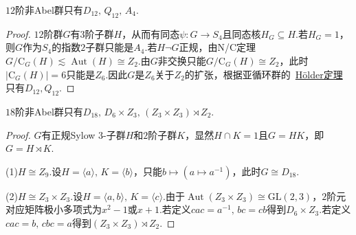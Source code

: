 \begin{prop}
	$12$阶非Abel群只有$D_{12},\,Q_{12},\,A_4$.
\end{prop}
\begin{proof}
	$12$阶群$G$有$3$阶子群$H$，从而有同态$\psi\colon G\to S_4$且同态核$H_G\subseteq H$.若$H_G=1$，则$G$作为$S_4$的指数$2$子群只能是$A_4$.若$H\neg G$正规，由N/C定理$G/\mathrm{C}_G(H)\lesssim\operatorname*{Aut}(H)\cong Z_2$.由$G$非交换只能$G/\mathrm{C}_G(H)\cong Z_2$，此时$|\mathrm{C}_G(H)|=6$只能是$Z_6$.因此$G$是$Z_6$关于$Z_2$的扩张，根据亚循环群的~\hyperlink{thm:Metacyclic}{H\"older定理}只有$D_{12},Q_{12}$.
\end{proof}
\begin{prop}
	$18$阶非Abel群只有$D_{18},\,D_6\times Z_3,\,(Z_3\times Z_3)\rtimes Z_2$.
\end{prop}
\begin{proof}
	$G$有正规Sylow $3$-子群$H$和$2$阶子群$K$，显然$H\cap K=1$且$G=HK$，即$G=H\rtimes K$.

	(1)$H\cong Z_9$.设$H=\langle a\rangle,\,K=\langle b\rangle $，只能$b\mapsto(a\mapsto a^{-1})$，此时$G\cong D_{18}$.

	(2)$H\cong Z_3\times Z_3$.设$H=\langle a,b\rangle,\,K=\langle c\rangle $.由于$\operatorname*{Aut}(Z_3\times Z_3)\cong\mathrm{GL}(2,3)$，$2$阶元对应矩阵极小多项式为$x^2-1$或$x+1$.若定义$cac=a^{-1},\,bc=cb$得到$D_6\times Z_3$.若定义$cac=b,\,cbc=a$得到$(Z_3\times Z_3)\rtimes Z_2$.
\end{proof}

